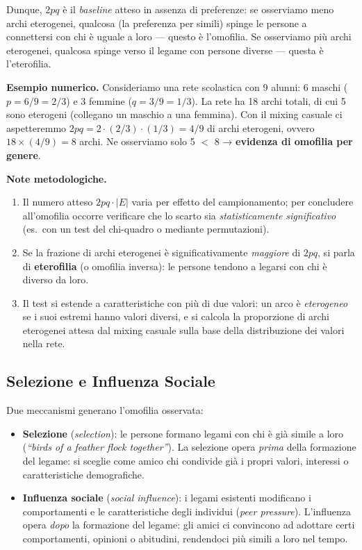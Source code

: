 \documentclass[12pt,a4paper]{article}
\begin{document}
Dunque, $2pq$ è il \emph{baseline} atteso in assenza di preferenze: se osserviamo meno
archi eterogenei, qualcosa (la preferenza per simili) spinge le persone a connettersi
con chi è uguale a loro — questo è l'omofilia. Se osserviamo più archi eterogenei,
qualcosa spinge verso il legame con persone diverse — questa è l'eterofilia.

\medskip
\noindent\textbf{Esempio numerico.}
Consideriamo una rete scolastica con 9 alunni: 6 maschi ($p = 6/9 = 2/3$) e 3 femmine
($q = 3/9 = 1/3$). La rete ha 18 archi totali, di cui 5 sono eterogeni (collegano un maschio
a una femmina). Con il mixing casuale ci aspetteremmo $2pq = 2 \cdot (2/3) \cdot (1/3) = 4/9$
di archi eterogeni, ovvero $18 \times (4/9) = 8$ archi. Ne osserviamo solo 5 $<$ 8 →
\textbf{evidenza di omofilia per genere}.

\medskip
\noindent\textbf{Note metodologiche.}
\begin{enumerate}
  \item Il numero atteso $2pq \cdot |E|$ varia per effetto del campionamento; per concludere
        all'omofilia occorre verificare che lo scarto sia \textit{statisticamente significativo}
        (es.\ con un test del chi-quadro o mediante permutazioni).
  \item Se la frazione di archi eterogenei è significativamente \emph{maggiore} di $2pq$,
        si parla di \textbf{eterofilia} (o omofilia inversa): le persone tendono a legarsi con
        chi è diverso da loro.
  \item Il test si estende a caratteristiche con più di due valori: un arco è
        \textit{eterogeneo} se i suoi estremi hanno valori diversi, e si calcola la proporzione
        di archi eterogenei attesa dal mixing casuale sulla base della distribuzione dei valori
        nella rete.
\end{enumerate}

\subsection{Selezione e Influenza Sociale}

Due meccanismi generano l'omofilia osservata:

\begin{itemize}
  \item \textbf{Selezione} (\textit{selection}): le persone formano legami con chi è già simile a loro
        (\textit{``birds of a feather flock together''}). La selezione opera \emph{prima} della
        formazione del legame: si sceglie come amico chi condivide già i propri valori, interessi
        o caratteristiche demografiche.
  \item \textbf{Influenza sociale} (\textit{social influence}): i legami esistenti modificano i comportamenti e le
        caratteristiche degli individui (\textit{peer pressure}). L'influenza opera \emph{dopo}
        la formazione del legame: gli amici ci convincono ad adottare certi comportamenti,
        opinioni o abitudini, rendendoci più simili a loro nel tempo.
\end{itemize}
\end{document}
